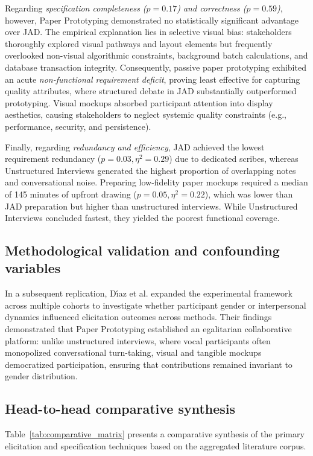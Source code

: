 \documentclass[conference]{IEEEtran}
\begin{document}
Regarding \textit{specification completeness ($p = 0.17$) and correctness ($p = 0.59$)}, however, Paper Prototyping demonstrated no statistically significant advantage over JAD. The empirical explanation lies in selective visual bias: stakeholders thoroughly explored visual pathways and layout elements but frequently overlooked non-visual algorithmic constraints, background batch calculations, and database transaction integrity. Consequently, passive paper prototyping exhibited an acute \textit{non-functional requirement deficit}, proving least effective for capturing quality attributes, where structured debate in JAD substantially outperformed prototyping. Visual mockups absorbed participant attention into display aesthetics, causing stakeholders to neglect systemic quality constraints (e.g., performance, security, and persistence).

Finally, regarding \textit{redundancy and efficiency}, JAD achieved the lowest requirement redundancy ($p = 0.03, \eta^2 = 0.29$) due to dedicated scribes, whereas Unstructured Interviews generated the highest proportion of overlapping notes and conversational noise. Preparing low-fidelity paper mockups required a median of 145 minutes of upfront drawing ($p = 0.05, \eta^2 = 0.22$), which was lower than JAD preparation but higher than unstructured interviews. While Unstructured Interviews concluded fastest, they yielded the poorest functional coverage.

\subsection{Methodological validation and confounding variables}
In a subsequent replication, D{\'\i}az et al. \cite{diaz2021gender} expanded the experimental framework across multiple cohorts to investigate whether participant gender or interpersonal dynamics influenced elicitation outcomes across methods. Their findings demonstrated that Paper Prototyping established an egalitarian collaborative platform: unlike unstructured interviews, where vocal participants often monopolized conversational turn-taking, visual and tangible mockups democratized participation, ensuring that contributions remained invariant to gender distribution.

\subsection{Head-to-head comparative synthesis}
Table~\ref{tab:comparative_matrix} presents a comparative synthesis of the primary elicitation and specification techniques based on the aggregated literature corpus.
\end{document}
